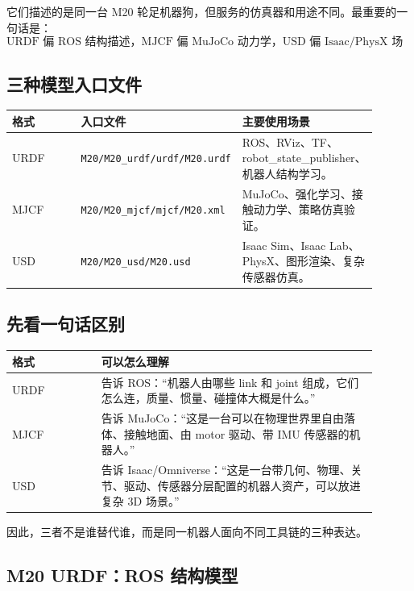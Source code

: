\documentclass[UTF8,11pt,a4paper]{ctexart}
\begin{document}
它们描述的是同一台 M20 轮足机器狗，但服务的仿真器和用途不同。最重要的一句话是：
\[
\boxed{
\text{URDF 偏 ROS 结构描述，MJCF 偏 MuJoCo 动力学，USD 偏 Isaac/PhysX 场景表达。}
}
\]

\subsection{三种模型入口文件}

\begin{center}
\begin{tabular}{p{0.22\linewidth}p{0.39\linewidth}p{0.29\linewidth}}
\toprule
格式 & 入口文件 & 主要使用场景 \\
\midrule
URDF &
\texttt{M20/M20\_urdf/urdf/M20.urdf} &
ROS、RViz、TF、robot\_state\_publisher、机器人结构学习。\\
MJCF &
\texttt{M20/M20\_mjcf/mjcf/M20.xml} &
MuJoCo、强化学习、接触动力学、策略仿真验证。\\
USD &
\texttt{M20/M20\_usd/M20.usd} &
Isaac Sim、Isaac Lab、PhysX、图形渲染、复杂传感器仿真。\\
\bottomrule
\end{tabular}
\end{center}

\subsection{先看一句话区别}

\begin{center}
\begin{tabular}{p{0.22\linewidth}p{0.68\linewidth}}
\toprule
格式 & 可以怎么理解 \\
\midrule
URDF & 告诉 ROS：“机器人由哪些 link 和 joint 组成，它们怎么连，质量、惯量、碰撞体大概是什么。”\\
MJCF & 告诉 MuJoCo：“这是一台可以在物理世界里自由落体、接触地面、由 motor 驱动、带 IMU 传感器的机器人。”\\
USD & 告诉 Isaac/Omniverse：“这是一台带几何、物理、关节、驱动、传感器分层配置的机器人资产，可以放进复杂 3D 场景。”\\
\bottomrule
\end{tabular}
\end{center}

因此，三者不是谁替代谁，而是同一机器人面向不同工具链的三种表达。

\subsection{M20 URDF：ROS 结构模型}
\end{document}
